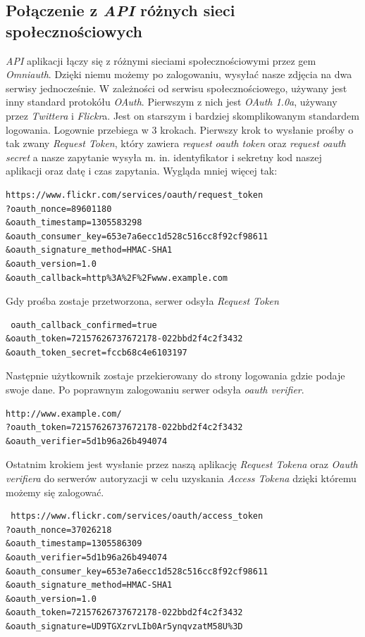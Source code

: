 \documentclass[openright]{xmgr}
\begin{document}
\subsection{Połączenie z \textit{API} różnych sieci społecznościowych}
\textit{API} aplikacji łączy się z różnymi sieciami społecznościowymi przez gem \textit{Omniauth}. Dzięki niemu możemy po zalogowaniu, wysyłać nasze zdjęcia na dwa serwisy jednocześnie. W zależności od serwisu społecznościowego, używany jest inny standard protokółu \textit{OAuth}. Pierwszym z nich jest \textit{OAuth 1.0a}, używany przez \textit{Twittera} i \textit{Flickr}a. Jest on starszym i bardziej skomplikowanym standardem logowania. Logownie przebiega w 3 krokach. Pierwszy krok to wysłanie prośby o tak zwany \textit{Request Token}, który zawiera \textit{request oauth token} oraz \textit{request oauth secret} a nasze zapytanie wysyła m. in.  identyfikator i sekretny kod naszej aplikacji oraz datę i czas zapytania. Wygląda mniej więcej tak:
\begin{verbatim}
https://www.flickr.com/services/oauth/request_token
?oauth_nonce=89601180
&oauth_timestamp=1305583298
&oauth_consumer_key=653e7a6ecc1d528c516cc8f92cf98611
&oauth_signature_method=HMAC-SHA1
&oauth_version=1.0
&oauth_callback=http%3A%2F%2Fwww.example.com
\end{verbatim}
\newpage
 Gdy prośba zostaje przetworzona, serwer odsyła \textit{Request Token} 
\begin{verbatim}
 oauth_callback_confirmed=true
&oauth_token=72157626737672178-022bbd2f4c2f3432
&oauth_token_secret=fccb68c4e6103197
\end{verbatim}
Następnie użytkownik zostaje przekierowany do strony logowania gdzie podaje swoje dane. Po poprawnym zalogowaniu serwer odsyła \textit{oauth verifier}.
\begin{verbatim}
http://www.example.com/
?oauth_token=72157626737672178-022bbd2f4c2f3432
&oauth_verifier=5d1b96a26b494074
\end{verbatim}
 Ostatnim krokiem jest wysłanie przez naszą aplikację \textit{Request Tokena} oraz \textit{Oauth verifiera} do serwerów autoryzacji w celu uzyskania \textit{Access Tokena} dzięki któremu możemy się zalogować.
 \begin{verbatim}
 https://www.flickr.com/services/oauth/access_token
?oauth_nonce=37026218
&oauth_timestamp=1305586309
&oauth_verifier=5d1b96a26b494074
&oauth_consumer_key=653e7a6ecc1d528c516cc8f92cf98611
&oauth_signature_method=HMAC-SHA1
&oauth_version=1.0
&oauth_token=72157626737672178-022bbd2f4c2f3432
&oauth_signature=UD9TGXzrvLIb0Ar5ynqvzatM58U%3D
\end{verbatim}
\end{document}

